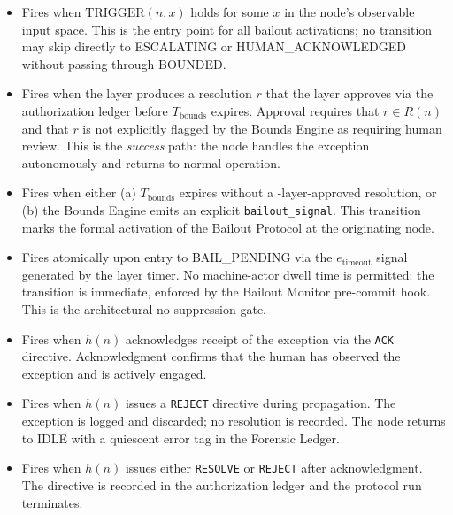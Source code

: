 \begin{itemize}\itemsep=0pt
\item[T1 --- \texttt{IDLE $\rightarrow$ BOUNDED}:] Fires when $\text{TRIGGER}(n, x)$ holds for some $x$ in the node's observable input space. This is the entry point for all bailout activations; no transition may skip directly to ESCALATING or HUMAN\_ACKNOWLEDGED without passing through BOUNDED.

\item[T2 --- \texttt{BOUNDED $\rightarrow$ HUMAN\_ACKNOWLEDGED}:] Fires when the \bounds{} layer produces a resolution $r$ that the \fact{} layer approves via the authorization ledger before $T_{\text{bounds}}$ expires. Approval requires that $r \in R(n)$ and that $r$ is not explicitly flagged by the Bounds Engine as requiring human review. This is the \emph{success} path: the node handles the exception autonomously and returns to normal operation.

\item[T3 --- \texttt{BOUNDED $\rightarrow$ BAIL\_PENDING}:] Fires when either (a) $T_{\text{bounds}}$ expires without a \fact-layer-approved resolution, or (b) the Bounds Engine emits an explicit \texttt{bailout\_signal}. This transition marks the formal activation of the Bailout Protocol at the originating node.

\item[T4 --- \texttt{BAIL\_PENDING $\rightarrow$ ESCALATING}:] Fires atomically upon entry to BAIL\_PENDING via the $e_{\text{timeout}}$ signal generated by the \fact{} layer timer. No machine-actor dwell time is permitted: the transition is immediate, enforced by the Bailout Monitor pre-commit hook. This is the architectural no-suppression gate.

\item[T5 --- \texttt{ESCALATING $\rightarrow$ HUMAN\_ACKNOWLEDGED}:] Fires when $h(n)$ acknowledges receipt of the exception via the \texttt{ACK} directive. Acknowledgment confirms that the human has observed the exception and is actively engaged.

\item[T6 --- \texttt{ESCALATING $\rightarrow$ IDLE}:] Fires when $h(n)$ issues a \texttt{REJECT} directive during propagation. The exception is logged and discarded; no resolution is recorded. The node returns to IDLE with a quiescent error tag in the Forensic Ledger.

\item[T7 --- \texttt{ESCALATING $\rightarrow$ RESOLVED}:] Fires when $h(n)$ issues either \texttt{RESOLVE} or \texttt{REJECT} after acknowledgment. The directive is recorded in the authorization ledger and the protocol run terminates.


\end{itemize}
